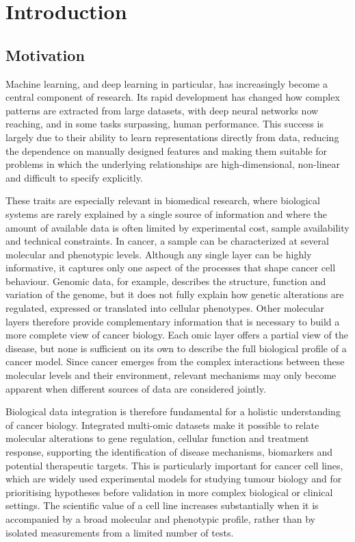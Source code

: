
\chapter{Introduction}
\label{chapter:introduction}

\section{Motivation}

Machine learning, and deep learning in particular, has increasingly become a central component of research. Its rapid development has changed how complex patterns are extracted from large datasets, with deep neural networks now reaching, and in some tasks surpassing, human performance. This success is largely due to their ability to learn representations directly from data, reducing the dependence on manually designed features and making them suitable for problems in which the underlying relationships are high-dimensional, non-linear and difficult to specify explicitly.

These traits are especially relevant in biomedical research, where biological systems are rarely explained by a single source of information and where the amount of available data is often limited by experimental cost, sample availability and technical constraints. In cancer, a sample can be characterized at several molecular and phenotypic levels. Although any single layer can be highly informative, it captures only one aspect of the processes that shape cancer cell behaviour. Genomic data, for example, describes the structure, function and variation of the genome, but it does not fully explain how genetic alterations are regulated, expressed or translated into cellular phenotypes. Other molecular layers therefore provide complementary information that is necessary to build a more complete view of cancer biology. Each omic layer offers a partial view of the disease, but none is sufficient on its own to describe the full biological profile of a cancer model. Since cancer emerges from the complex interactions between these molecular levels and their environment, relevant mechanisms may only become apparent when different sources of data are considered jointly.

Biological data integration is therefore fundamental for a holistic understanding of cancer biology. Integrated multi-omic datasets make it possible to relate molecular alterations to gene regulation, cellular function and treatment response, supporting the identification of disease mechanisms, biomarkers and potential therapeutic targets. This is particularly important for cancer cell lines, which are widely used experimental models for studying tumour biology and for prioritising hypotheses before validation in more complex biological or clinical settings. The scientific value of a cell line increases substantially when it is accompanied by a broad molecular and phenotypic profile, rather than by isolated measurements from a limited number of tests.


